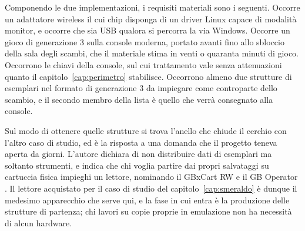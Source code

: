 Componendo le due implementazioni, i requisiti materiali sono i seguenti. Occorre un adattatore wireless il cui chip disponga di un driver Linux capace di modalità monitor, e occorre che sia USB qualora si percorra la via Windows. Occorre un gioco di generazione 3 sulla console moderna, portato avanti fino allo sbloccio della sala degli scambi, che il materiale stima in venti o quaranta minuti di gioco. Occorrono le chiavi della console, sul cui trattamento vale senza attenuazioni quanto il capitolo~\ref{cap:perimetro} stabilisce. Occorrono almeno due strutture di esemplari nel formato di generazione 3 da impiegare come controparte dello scambio, e il secondo membro della lista è quello che verrà consegnato alla console.

Sul modo di ottenere quelle strutture si trova l'anello che chiude il cerchio con l'altro caso di studio, ed è la risposta a una domanda che il progetto teneva aperta da giorni. L'autore dichiara di non distribuire dati di esemplari ma soltanto strumenti, e indica che chi voglia partire dai propri salvataggi su cartuccia fisica impieghi un lettore, nominando il GBxCart RW e il GB Operator \cite{frlg-ldn-trade}. Il lettore acquistato per il caso di studio del capitolo~\ref{cap:smeraldo} è dunque il medesimo apparecchio che serve qui, e la fase in cui entra è la produzione delle strutture di partenza; chi lavori su copie proprie in emulazione non ha necessità di alcun hardware.
